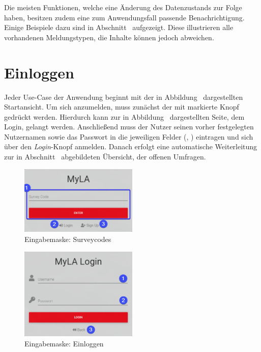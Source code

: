 Die meisten Funktionen, welche eine Änderung des Datenzustands zur Folge haben, besitzen zudem eine zum Anwendungsfall passende Benachrichtigung.
Einige Beispiele dazu sind in Abschnitt~ aufgezeigt.
Diese illustrieren alle vorhandenen Meldungstypen, die Inhalte können jedoch abweichen.

\section{Einloggen}
\label{ssec:Einloggen}

Jeder Use-Case der Anwendung beginnt mit der in Abbildung~ dargestellten Startansicht.
Um sich anzumelden, muss zunächst der mit \desTwo markierte Knopf gedrückt werden.
Hierdurch kann zur in Abbildung~ dargestellten Seite, dem Login, gelangt werden.
Anschließend muss der Nutzer seinen vorher festgelegten Nutzernamen sowie das Passwort in die jeweiligen Felder (\desOne, \desTwo) eintragen und sich über den \emph{Login}-Knopf anmelden.
Danach erfolgt eine automatische Weiterleitung zur in Abschnitt~ abgebildeten Übersicht, der offenen Umfragen.

\begin{figure}[H]
	\centering
	\includegraphics[width=0.5\textwidth, keepaspectratio]{img/guide/SurveyCode.png}
	\captionsetup{justification=centering, format=plain}
	\caption[Eingabemaske: Surveycodes]{Eingabemaske: Surveycodes \\\quelleScreenshot}
	\label{fig:EingabemaskeSurveycode}
\end{figure}

\begin{figure}[H]
	\centering
	\includegraphics[width=0.5\textwidth, keepaspectratio]{img/guide/Login.png}
	\captionsetup{justification=centering, format=plain}
	\caption[Eingabemaske: Einloggen]{Eingabemaske: Einloggen \\\quelleScreenshot}
	\label{fig:Einloggen}
\end{figure}


